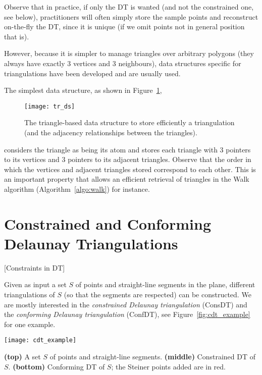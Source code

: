 Observe that in practice, if only the DT is wanted (and not the constrained one, see below), practitioners will often simply store the sample points and reconstruct on-the-fly the DT, since it is unique (if we omit points not in general position that is).

However, because it is simpler to manage triangles over arbitrary polygons (they always have exactly 3 vertices and 3 neighbours), data structures specific for triangulations have been developed and are usually used.

The simplest data structure, as shown in Figure~\ref{fig:tr_ds}, 
\begin{figure}
  \centering
  \texttt{[image: tr\_ds]}
  \caption{The triangle-based data structure to store efficiently a triangulation (and the adjacency relationships between the triangles).}%
\label{fig:tr_ds}
\end{figure}
considers the triangle as being its atom and stores each triangle with 3 pointers to its vertices and 3 pointers to its adjacent triangles. 
Observe that the order in which the vertices and adjacent triangles stored correspond to each other. 
This is an important property that allows an efficient retrieval of triangles in the Walk algorithm (Algorithm~\ref{algo:walk}) for instance.



\section{Constrained and Conforming Delaunay Triangulations}[Constraints in DT]%

Given as input a set $S$ of points and straight-line segments in the plane, different triangulations of $S$ (so that the segments are respected) can be constructed. 
We are mostly interested in the \emph{constrained Delaunay triangulation} (ConsDT) and the \emph{conforming Delaunay triangulation} (ConfDT), see Figure~\ref{fig:cdt_example} for one example.
\begin{marginfigure}
  \centering
  \texttt{[image: cdt\_example]}
  \caption{\textbf{(top)} A set $S$ of points and straight-line segments. \textbf{(middle)} Constrained DT of $S$. \textbf{(bottom)} Conforming DT of $S$; the Steiner points added are in red.}%
\label{fig:cdt_example}
\end{marginfigure}

%
